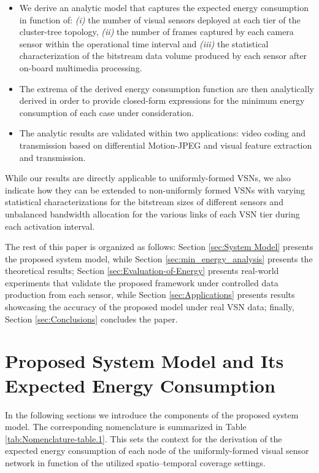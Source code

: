 \documentclass[twocolumn,english]{IEEEtran}
\theoremstyle{plain}
\theoremstyle{definition}
\begin{document}
\begin{itemize}[leftmargin=*]
\item

We derive an analytic model that captures the expected energy consumption
in function of: \emph{(i)} the number of visual sensors deployed at
each tier of the cluster-tree topology, \emph{(ii)} the number of
frames captured by each camera sensor within the operational time
interval and \emph{(iii)} the statistical characterization of the
bitstream data volume produced by each sensor after on-board multimedia
processing.

\item

The extrema of the derived energy consumption function are then analytically
derived in order to provide closed-form expressions for the minimum
energy consumption of each case under consideration.

\item

The analytic results are validated within two applications: video
coding and transmission based on differential Motion-JPEG and visual
feature extraction and transmission.

\end{itemize}

While our results are directly applicable to uniformly-formed VSNs,
we also indicate how they can be extended to non-uniformly formed
VSNs with varying statistical characterizations for the bitstream
sizes of different sensors and unbalanced bandwidth allocation for
the various links of each VSN tier during each activation interval. 

The rest of this paper is organized as follows: Section \ref{sec:System Model}
presents the proposed system model, while Section \ref{sec:min_energy_analysis}
presents the theoretical results; Section \ref{sec:Evaluation-of-Energy}
presents real-world experiments that validate the proposed framework
under controlled data production from each sensor, while Section \ref{sec:Applications}
presents results showcasing the accuracy of the proposed model under
real VSN data; finally, Section \ref{sec:Conclusions} concludes the
paper.


\section{Proposed System Model and Its Expected Energy Consumption\label{sec:System Model}}

In the following sections we introduce the components of the proposed
system model. The corresponding nomenclature is summarized in Table
\ref{tab:Nomenclature-table.1}. This sets the context for the derivation
of the expected energy consumption of each node of the uniformly-formed
visual sensor network in function of the utilized spatio--temporal
coverage settings.
\end{document}
